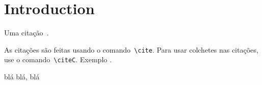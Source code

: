 \chapter{Introduction} \label{chap:introduction}

Uma citação~\cite{artigo:2015}.

As citações são feitas usando o comando~\texttt{\textbackslash cite}. Para usar colchetes nas citações, use o comando~\texttt{\textbackslash citeC}. Exemplo .


blá blá, blá \cite{artigo:2015}